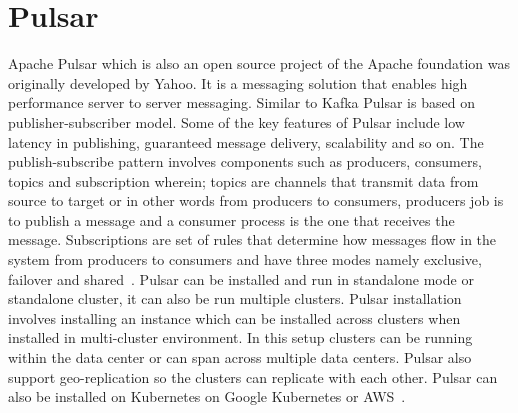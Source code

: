 \section{Pulsar}

Apache Pulsar which is also an open source project of the Apache
foundation was originally developed by Yahoo. It is a messaging
solution that enables high performance server to server messaging.
Similar to Kafka Pulsar is based on publisher-subscriber model.  Some
of the key features of Pulsar include low latency in publishing,
guaranteed message delivery, scalability and so on.  The
publish-subscribe pattern involves components such as producers,
consumers, topics and subscription wherein; topics are channels that
transmit data from source to target or in other words from producers
to consumers, producers job is to publish a message and a consumer
process is the one that receives the message.  Subscriptions are set
of rules that determine how messages flow in the system from producers
to consumers and have three modes namely exclusive, failover and
shared~\cite{hid-sp18-517-pulsar-apache}.  Pulsar can be installed and
run in standalone mode or standalone cluster, it can also be run
multiple clusters. Pulsar installation involves installing an instance
which can be installed across clusters when installed in multi-cluster
environment. In this setup clusters can be running within the data
center or can span across multiple data centers.  Pulsar also support
geo-replication so the clusters can replicate with each other. Pulsar
can also be installed on Kubernetes on Google Kubernetes or
AWS~\cite{hid-sp18-517-pulsar-apache}.
